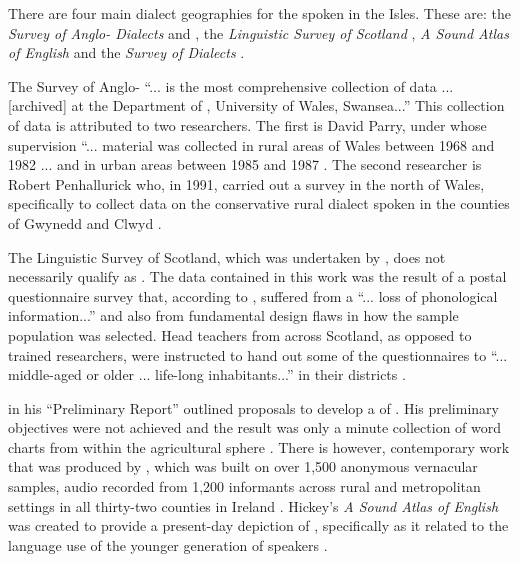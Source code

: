 There are four main dialect geographies for the   spoken in the  Isles. These are: the \emph{Survey of Anglo- Dialects} \citep{Parry77, Parry79} and \citet{Penhallurick91}, the \emph{Linguistic Survey of Scotland} \citep{Mather75}, \emph{A Sound Atlas of  English} \citep{Hickey04} and the \emph{Survey of  Dialects} \citep{Orton6271}.

The Survey of Anglo-  ``... is the most comprehensive collection of   data ... [archived] at the Department of , University of Wales, Swansea...'' This collection of  data is attributed to two researchers. The first is David Parry, under whose supervision ``... material was collected in rural areas of Wales between 1968 and 1982 ... and in urban areas between 1985 and 1987 \citep[100]{Penhallurick04}. The second researcher is Robert Penhallurick who, in 1991, carried out a survey in the north of Wales, specifically to collect data on the conservative rural  dialect spoken in the counties of Gwynedd and Clwyd \citep{Penhallurick91}.

The Linguistic Survey of Scotland, which was undertaken by  \citet{Mather75}, does not necessarily qualify as . The data contained in this work was the result of a postal questionnaire survey that, according to  \citet[225]{Macaulay77}, suffered from a ``... loss of phonological information...'' and also from fundamental design flaws in how the sample population was selected. Head teachers from across Scotland, as opposed to trained researchers, were instructed to hand out some of the questionnaires to ``... middle-aged or older ... life-long inhabitants...'' in their districts \citep[14]{Macaulay77}.

\citet{Henry58} in his ``Preliminary Report'' outlined proposals to develop a  of  . His preliminary objectives were not achieved and the result was only a minute collection of word charts from within the agricultural sphere \citep{Corrigan10}. There is however, contemporary work that was produced by \citet{Hickey04}, which was built on over 1,500 anonymous vernacular samples, audio recorded from 1,200 informants across rural and metropolitan settings in all thirty-two counties in Ireland \citep{Corrigan10, Hickey04}. Hickey's \emph{A Sound Atlas of  English} was created to provide a present-day depiction of  , specifically as it related to the language use of the younger generation of   speakers \citep{Hickey04}.

